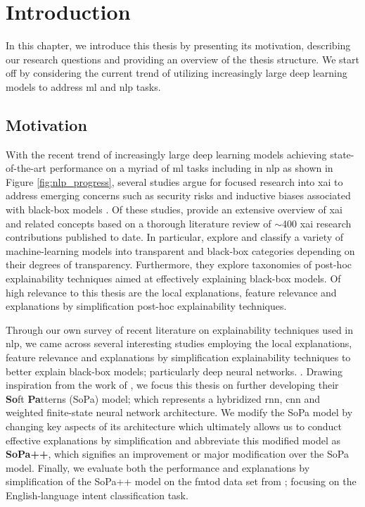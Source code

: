 \chapter{Introduction}

\label{chapter:introduction}

In this chapter, we introduce this thesis by presenting its motivation,
describing our research questions and providing an overview of the thesis
structure. We start off by considering the current trend of utilizing
increasingly large deep learning models to address \ac{ml}
and \ac{nlp} tasks.

\section{Motivation}

With the recent trend of increasingly large deep learning models achieving
state-of-the-art performance on a myriad of \ac{ml} tasks including in \ac{nlp} as
shown in Figure \ref{fig:nlp_progress}, several studies argue for focused
research into \ac{xai} to address emerging
concerns such as security risks and inductive biases associated with black-box
models
\citep{doran2017does,townsend2019extracting,danilevsky2020survey,arrieta2020explainable}.
Of these studies, \citet{arrieta2020explainable} provide an extensive overview
of \ac{xai} and related concepts based on a thorough literature review of $\sim$400
\ac{xai} research contributions published to date. In particular,
\citet{arrieta2020explainable} explore and classify a variety of
machine-learning models into transparent and black-box categories depending on
their degrees of transparency. Furthermore, they explore taxonomies of post-hoc
explainability techniques aimed at effectively explaining black-box models. Of
high relevance to this thesis are the local explanations, feature relevance and
explanations by simplification post-hoc explainability techniques.

Through our own survey of recent literature on explainability techniques used in
\ac{nlp}, we came across several interesting studies employing the local
explanations, feature relevance and explanations by simplification
explainability techniques to better explain black-box models; particularly deep
neural networks.
\citep{schwartz2018sopa,peng2018rational,suresh-etal-2019-distilling,wang2019state,jiang2020cold}.
Drawing inspiration from the work of \citet{schwartz2018sopa}, we focus this
thesis on further developing their \textbf{So}ft \textbf{Pa}tterns (SoPa) model;
which represents a hybridized \ac{rnn}, \ac{cnn} and weighted finite-state neural network
architecture. We modify the SoPa model by changing key aspects of its
architecture which ultimately allows us to conduct effective explanations by
simplification and abbreviate this modified model as \textbf{SoPa++}, which
signifies an improvement or major modification over the SoPa model. Finally, we
evaluate both the performance and explanations by simplification of the SoPa++
model on the \ac{fmtod} data set from
\citet{schuster-etal-2019-cross-lingual}; focusing on the English-language
intent classification task.

